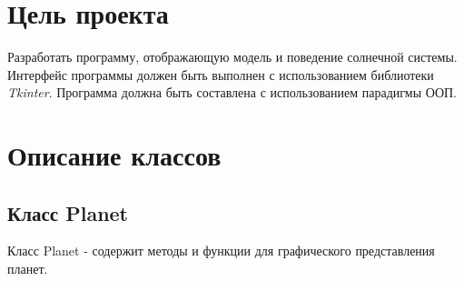 \documentclass[11pt,a4paper]{report}
\begin{document}
\section{Цель проекта}
Разработать программу, отображающую модель и поведение солнечной системы. Интерфейс программы должен быть выполнен с использованием библиотеки \textit{Tkinter}. Программа должна быть составлена с использованием парадигмы ООП.

\section{Описание классов}
\subsection{Класс Planet}
Класс Planet  - содержит методы и функции для графического представления планет.
\end{document}
